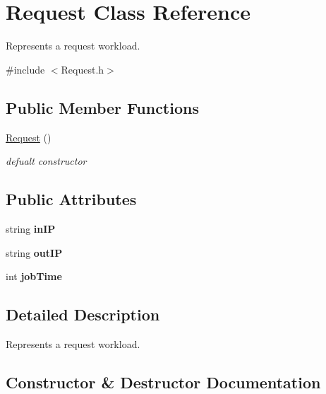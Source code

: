 \hypertarget{classRequest}{}\section{Request Class Reference}
\label{classRequest}


Represents a request workload.  




{\ttfamily \#include $<$Request.\+h$>$}

\subsection*{Public Member Functions}
\begin{DoxyCompactItemize}
\item 
\hyperlink{classRequest_afaf8d8928de7ffff8a3767589489bd33}{Request} ()
\begin{DoxyCompactList}\small\item\em defualt constructor \end{DoxyCompactList}\end{DoxyCompactItemize}
\subsection*{Public Attributes}
\begin{DoxyCompactItemize}
\item 
\mbox{\label{classRequest_ae392c6c23536abdb45784e31112458ac}} 
string {\bfseries in\+IP}
\item 
\mbox{\label{classRequest_ad7c456a510bf588b92a17ede4ae9ff73}} 
string {\bfseries out\+IP}
\item 
\mbox{\label{classRequest_a24731bb1eaf05b3115336191a71d99ae}} 
int {\bfseries job\+Time}
\end{DoxyCompactItemize}


\subsection{Detailed Description}
Represents a request workload. 

\subsection{Constructor \& Destructor Documentation}
\mbox{\label{classRequest_afaf8d8928de7ffff8a3767589489bd33}} 
